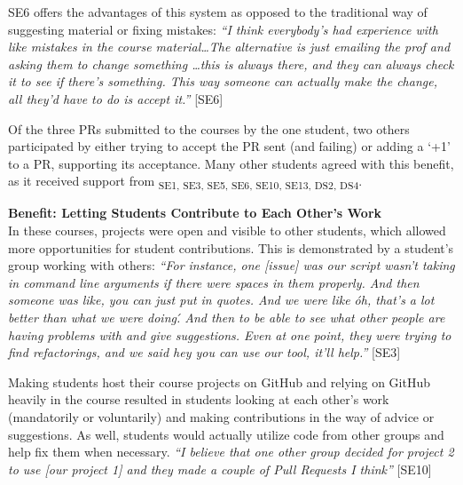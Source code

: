 SE6 offers the advantages of this system as opposed to the traditional way of suggesting material or fixing mistakes: \textit{``I think everybody's had experience with like mistakes in the course material\ldots The alternative is just emailing the prof and asking them to change something \ldots this is always there, and they can always check it to see if there's something. This way someone can actually make the change, all they'd have to do is accept it.''} [SE6]

Of the three PRs submitted to the courses by the one student, two others participated by either trying to accept the PR sent (and failing) or adding a `+1' to a PR, supporting its acceptance. Many other students agreed with this benefit, as it received support from \textsubscript{SE1, SE3, SE5, SE6, SE10, SE13, DS2, DS4}. %


\textbf{Benefit: Letting Students Contribute to Each Other's Work} \\
In these courses, projects were open and visible to other students, which allowed more opportunities for student contributions. This is demonstrated by a student's group working with others:
\textit{``For instance, one [issue] was our script wasn't taking in command line arguments if there were spaces in them properly. And then someone was like, you can just put in quotes. And we were like \'oh, that's a lot better than what we were doing\'. And then to be able to see what other people are having problems with and give suggestions. Even at one point, they were trying to find refactorings, and we said hey you can use our tool, it'll help.''} [SE3]

Making students host their course projects on GitHub and relying on GitHub heavily in the course resulted in students looking at each other's work (mandatorily or voluntarily) and making contributions in the way of advice or suggestions. As well, students would actually utilize code from other groups and help fix them when necessary. \textit{``I believe that one other group decided for project 2 to use [our project 1] and they made a couple of Pull Requests I think''} [SE10]

